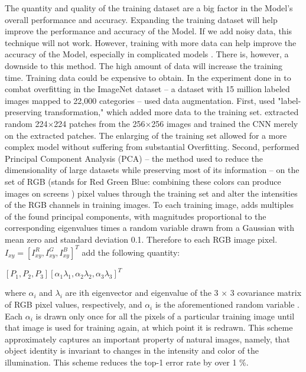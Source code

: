 \documentclass[oneside,12pt,article]{article}
\begin{document}
The quantity and quality of the training dataset are a big factor in the Model's overall performance and accuracy. Expanding the training dataset will help improve the performance and accuracy of the Model. If we add noisy data, this technique will not work. However, training with more data can help improve the accuracy of the Model, especially in complicated models \cite{ying2019overview}. There is, however, a downside to this method. The high amount of data will increase the training time. Training data could be expensive to obtain. In the experiment done in \cite{krizhevsky2012imagenet} to combat overfitting in the ImageNet dataset – a dataset with 15 million labeled images mapped to 22,000 categories – \cite{krizhevsky2012imagenet} used data augmentation. First, \cite{krizhevsky2012imagenet} used "label-preserving transformation," which added more data to the training set. \cite{krizhevsky2012imagenet} extracted random 224$\times$224 patches from the 256$\times$256 images and trained the CNN merely on the extracted patches. The enlarging of the training set allowed for a more complex model without suffering from substantial Overfitting. Second, \cite{krizhevsky2012imagenet} performed Principal Component Analysis (PCA) – the method used to reduce the dimensionality of large datasets while preserving most of its information \cite{jolliffe2016principal} – on the set of RGB (stands for Red Green Blue: combining these colors can produce images on screens ) pixel values through the training set and alter the intensities of the RGB channels in training images. To each training image, \cite{krizhevsky2012imagenet} adds multiples of the found principal components, with magnitudes proportional to the corresponding eigenvalues times a random variable drawn from a Gaussian with mean zero and standard deviation 0.1. Therefore to each RGB image pixel. $ I_{xy} = [I^{R}_{xy}, I^{G}_{xy}, I^{B}_{xy}]^T $ \cite{krizhevsky2012imagenet} add the following quantity:

\begin{center}

$[P_ 1, P_2, P_3] [\alpha_1 \lambda_1 , \alpha_2 \lambda_2, \alpha_3 \lambda_3]^T$

\end{center}
where $\alpha_i$ and $\lambda_i$ are ith eigenvector and eigenvalue of the 3 × 3 covariance matrix of RGB pixel values, respectively, and $\alpha_i$ is the aforementioned random variable \cite{krizhevsky2012imagenet}. Each $\alpha_i$ is drawn only once for all the pixels of a particular training image until that image is used for training again, at which point it is redrawn. This scheme approximately captures an important property of natural images, namely, that object identity is invariant to changes in the intensity and color of the illumination. This scheme reduces the top-1 error rate by over 1 \%.
\end{document}
